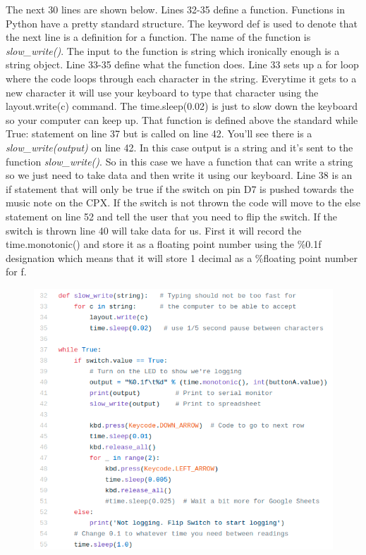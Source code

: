 The next 30 lines are shown below. Lines 32-35 define a
function. Functions in Python have a pretty standard structure. The
keyword def is used to denote that the next line is a definition for a
function. The name of the function is {\it slow\_write()}. The input to the
function is string which ironically enough is a string object. Line
33-35 define what the function does. Line 33 sets up a for loop where
the code loops through each character in the string. Everytime it gets
to a new character it will use your keyboard to type that character
using the layout.write(c) command. The time.sleep(0.02) is just to
slow down the keyboard so your computer can keep up. That function is
defined above the standard while True: statement on line 37 but is
called on line 42. You’ll see there is a {\it slow\_write(output)} on line
42. In this case output is a string and it’s sent to the function
{\it slow\_write()}. So in this case we have a function that can write a
string so we just need to take data and then write it using our
keyboard. Line 38 is an if statement that will only be true if the
switch on pin D7 is pushed towards the music note on the CPX. If the
switch is not thrown the code will move to the else statement on line
52 and tell the user that you need to flip the switch. If the switch
is thrown line 40 will take data for us. First it will record the
time.monotonic() and store it as a floating point number using the
\%0.1f designation which means that it will store 1 decimal as a
\%floating point number for f.
\begin{figure}[H]
  \begin{center}
    \includegraphics[width=\textwidth]{Figures/Typing2.png}
  \end{center}
\end{figure}
